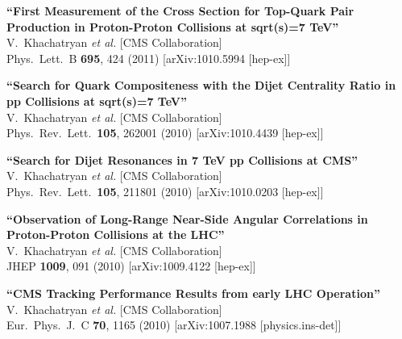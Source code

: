 \documentclass[10pt, a4paper]{article}
\begin{document}
\begin{thebibliography}{599}
{\bf ``First Measurement of the Cross Section for Top-Quark Pair Production in Proton-Proton Collisions at sqrt(s)=7 TeV''}
  \\{}V.~Khachatryan {\it et al.}  [CMS Collaboration]
  \\{}Phys.\ Lett.\  B {\bf 695}, 424 (2011)
  [arXiv:1010.5994 [hep-ex]]

{\bf ``Search for Quark Compositeness with the Dijet Centrality Ratio in pp Collisions at sqrt(s)=7 TeV''}
  \\{}V.~Khachatryan {\it et al.}  [CMS Collaboration]
  \\{}Phys.\ Rev.\ Lett.\  {\bf 105}, 262001 (2010)
  [arXiv:1010.4439 [hep-ex]]

{\bf ``Search for Dijet Resonances in 7 TeV pp Collisions at CMS''}
  \\{}V.~Khachatryan {\it et al.}  [CMS Collaboration]
  \\{}Phys.\ Rev.\ Lett.\  {\bf 105}, 211801 (2010)
  [arXiv:1010.0203 [hep-ex]]

{\bf ``Observation of Long-Range Near-Side Angular Correlations in Proton-Proton Collisions at the LHC''}
  \\{}V.~Khachatryan {\it et al.}  [CMS Collaboration]
  \\{}JHEP {\bf 1009}, 091 (2010)
  [arXiv:1009.4122 [hep-ex]]

{\bf ``CMS Tracking Performance Results from early LHC Operation''}
  \\{}V.~Khachatryan {\it et al.}  [CMS Collaboration]
  \\{}Eur.\ Phys.\ J.\  C {\bf 70}, 1165 (2010)
  [arXiv:1007.1988 [physics.ins-det]]


\end{thebibliography}
\end{document}
